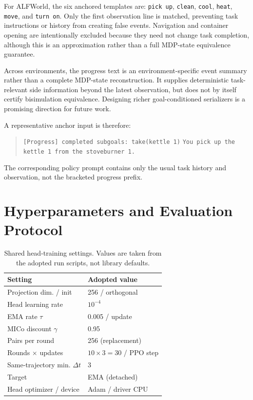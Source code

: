 For ALFWorld, the six anchored templates are:
\texttt{pick up}, \texttt{clean}, \texttt{cool}, \texttt{heat}, \texttt{move}, and \texttt{turn on}. Only the first observation line is matched, preventing task instructions or history from creating false events. Navigation and container opening are intentionally excluded because they need not change task completion, although this is an approximation rather than a full MDP-state equivalence guarantee.

Across environments, the progress text is an environment-specific event summary rather than a complete MDP-state reconstruction. It supplies deterministic task-relevant side information beyond the latest observation, but does not by itself certify bisimulation equivalence. Designing richer goal-conditioned serializers is a promising direction for future work.

A representative anchor input is therefore:
\begin{quote}\small
\texttt{[Progress] completed subgoals: take(kettle 1)}\newline
\texttt{You pick up the kettle 1 from the stoveburner 1.}
\end{quote}
The corresponding policy prompt contains only the usual task history and observation, not the bracketed progress prefix.

\section{Hyperparameters and Evaluation Protocol}
\label{app:hyperparams}

\begin{table}[h]
\centering
\caption{Shared head-training settings. Values are taken from the adopted run scripts, not library defaults.}
\label{tab:head_hparams}
\small
\renewcommand{\arraystretch}{1.15}
\begin{tabular}{@{}p{3.8cm}p{3.7cm}@{}}
\toprule
Setting & Adopted value \\
\midrule
Projection dim. / init & 256 / orthogonal \\
Head learning rate & $10^{-4}$ \\
EMA rate $\tau$ & 0.005 / update \\
MICo discount $\gamma$ & 0.95 \\
Pairs per round & 256 (replacement) \\
Rounds $\times$ updates & $10\times3=30$ / PPO step \\
Same-trajectory min. $\Delta t$ & 3 \\
Target & EMA (detached) \\
Head optimizer / device & Adam / driver CPU \\
\bottomrule
\end{tabular}
\end{table}

